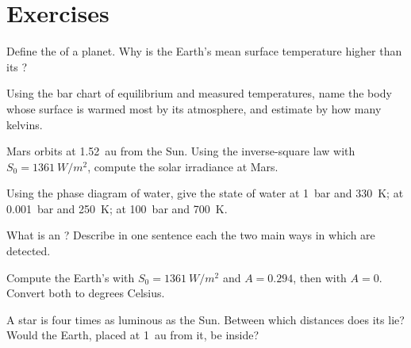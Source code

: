 \section{Exercises}

\begin{exercise}[$\star$]\label{exo:g10:habitable-planet:1}
Define the  of a planet. Why is the Earth's mean
surface temperature higher than its ?
\end{exercise}

\begin{exercise}[$\star$]\label{exo:g10:habitable-planet:2}
Using the bar chart of equilibrium and measured temperatures, name the body
whose surface is warmed most by its atmosphere, and estimate by how many
kelvins.
\end{exercise}

\begin{exercise}[$\star$]\label{exo:g10:habitable-planet:3}
Mars orbits at \qty{1.52}{au} from the Sun. Using the inverse-square law with
$S_0 = \qty{1361}{W/m^2}$, compute the solar irradiance at Mars.
\end{exercise}

\begin{exercise}[$\star$]\label{exo:g10:habitable-planet:4}
Using the phase diagram of water, give the state of water at \qty{1}{bar}
and \qty{330}{K}; at \qty{0.001}{bar} and \qty{250}{K}; at \qty{100}{bar} and
\qty{700}{K}.
\end{exercise}

\begin{exercise}[$\star$]\label{exo:g10:habitable-planet:5}
What is an ? Describe in one sentence each the two main ways in
which  are detected.
\end{exercise}

\begin{exercise}[$\star\star$]\label{exo:g10:habitable-planet:6}
Compute the Earth's  with $S_0 = \qty{1361}{W/m^2}$
and $A = 0.294$, then with $A = 0$. Convert both to degrees Celsius.
\end{exercise}

\begin{exercise}[$\star\star$]\label{exo:g10:habitable-planet:7}
A star is four times as luminous as the Sun. Between which distances does
its  lie? Would the Earth, placed at \qty{1}{au} from it, be
inside?
\end{exercise}

